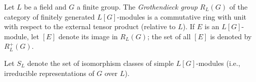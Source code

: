 Let $L$ be a field and $G$ a finite group. The \emph{Grothendieck group} $R_L(G)$ of the category of finitely generated $L[G]$-modules is a commutative ring with unit with respect to the external tensor product (relative to $L$). If $E$ is an $L[G]$-module, let $[E]$ denote its image in $R_L(G)$; the set of all $[E]$ is denoted by $R_L^+(G)$.

Let $S_L$ denote the set of isomorphism classes of simple $L[G]$-modules (i.e., irreducible representations of $G$ over $L$).
